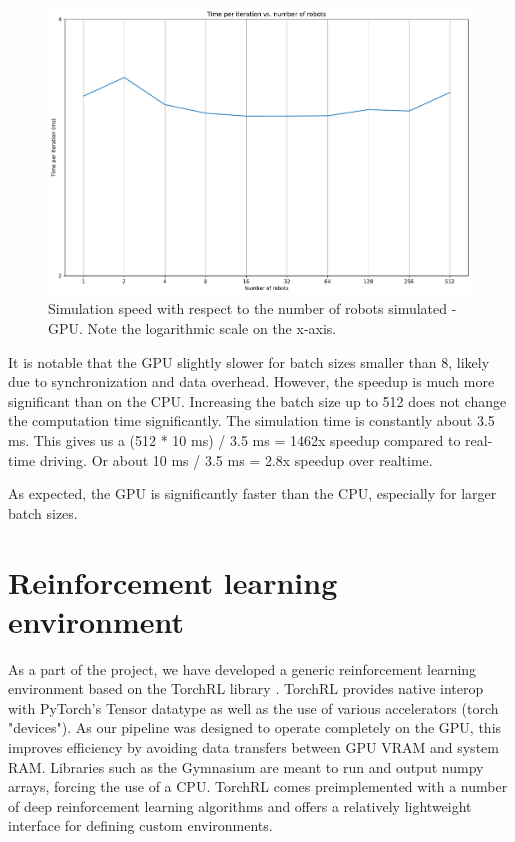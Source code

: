 \documentclass[a4paper,12pt]{article}
\begin{document}
\begin{figure}[H]
  \centering
  \includegraphics[width=1.\textwidth]{fig/benchmark_cuda_2025-01-12_21-41-37_eager.pdf}
  \caption{Simulation speed with respect to the number of robots simulated - GPU. Note the logarithmic scale on the x-axis.}
  \label{fig:gpu_speedup}
\end{figure}

It is notable that the GPU slightly slower for batch sizes smaller than 8, likely due to synchronization and data overhead. However, the speedup is much more significant than on the CPU. Increasing the batch size up to 512 does not change the computation time significantly. The simulation time is constantly about 3.5 ms. This gives us a (512 * 10 ms) / 3.5 ms = 1462x speedup compared to real-time driving. Or about 10 ms / 3.5 ms = 2.8x speedup over realtime.

As expected, the GPU is significantly faster than the CPU, especially for larger batch sizes.

\clearpage
\section{Reinforcement learning environment}

As a part of the project, we have developed a generic reinforcement learning environment based on the TorchRL library \citep{bou2023torchrldatadrivendecisionmakinglibrary}. TorchRL provides native interop with PyTorch's Tensor datatype as well as the use of various accelerators (torch "devices"). As our pipeline was designed to operate completely on the GPU, this improves efficiency by avoiding data transfers between GPU VRAM and system RAM. Libraries such as the Gymnasium \citep{towers2024gymnasiumstandardinterfacereinforcement} are meant to run and output numpy arrays, forcing the use of a CPU. TorchRL comes preimplemented with a number of deep reinforcement learning algorithms and offers a relatively lightweight interface for defining custom environments.
\end{document}

